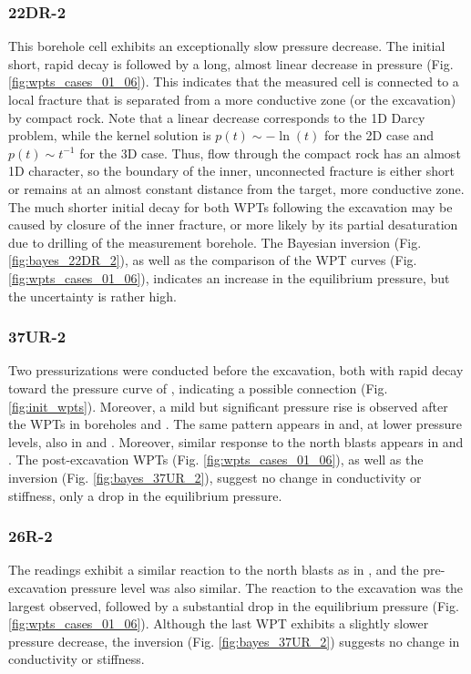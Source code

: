 \subsubsection{22DR-2}
This borehole cell exhibits an exceptionally slow pressure decrease. The initial short, rapid decay is followed by a long, almost linear decrease in pressure
(Fig. \ref{fig:wpts_cases_01_06}). This indicates that the measured cell is connected to a local fracture that is separated from a more conductive
zone (or the excavation) by compact rock. Note that a linear decrease corresponds to the 1D Darcy problem, while the kernel solution is $p(t) \sim -\ln(t)$
for the 2D case and $p(t) \sim t^{-1}$ for the 3D case. Thus, flow through the compact rock has an almost 1D character, so the boundary of the inner,
unconnected fracture is either short or remains at an almost constant distance from the target, more conductive zone. The much shorter initial decay
for both WPTs following the excavation may be caused by closure of the inner fracture, or more likely by its partial desaturation due to drilling of the measurement borehole.
The Bayesian inversion (Fig. \ref{fig:bayes_22DR_2}), as well as the comparison of the WPT curves
(Fig. \ref{fig:wpts_cases_01_06}), indicates an increase in the equilibrium pressure, but the uncertainty is rather high.


\subsubsection{37UR-2}
Two pressurizations were conducted before the excavation, both with rapid decay toward the pressure curve of , indicating a
possible connection (Fig. \ref{fig:init_wpts}). Moreover, a mild but significant pressure rise is observed after the WPTs in boreholes
 and . The same pattern appears in  and, at lower pressure levels, also in  and . Moreover, similar response to the north blasts appears in  and .
The post-excavation WPTs (Fig. \ref{fig:wpts_cases_01_06}), as well as the inversion (Fig. \ref{fig:bayes_37UR_2}),
suggest no change in conductivity or stiffness, only a drop in the equilibrium pressure.

\subsubsection{26R-2}
The readings exhibit a similar reaction to the north blasts as in , and the pre-excavation pressure level was also similar.
The reaction to the excavation was the largest observed, followed by a substantial drop in the equilibrium pressure
(Fig. \ref{fig:wpts_cases_01_06}). Although the last WPT exhibits a slightly slower pressure decrease, the inversion
(Fig. \ref{fig:bayes_37UR_2}) suggests no change in conductivity or stiffness.


